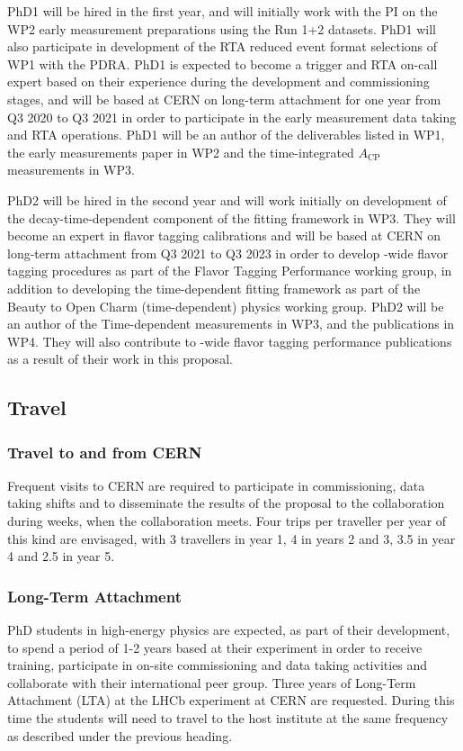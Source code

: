 \documentclass[11pt,a4paper]{article}
\begin{document}
PhD1 will be hired in the first year, and will initially work with the PI on the WP2 early measurement preparations using the Run 1+2 \LHCb datasets. PhD1 will also participate in development of the RTA reduced event format selections of WP1 with the PDRA. PhD1 is expected to become a trigger and RTA on-call expert based on their experience during the development and commissioning stages, and will be based at CERN on long-term attachment for one year from Q3 2020 to Q3 2021 in order to participate in the early measurement data taking and RTA operations. PhD1 will be an author of the deliverables listed in WP1, the early measurements paper in WP2 and the time-integrated $A_{\text{CP}}$ measurements in WP3.  

PhD2 will be hired in the second year and will work initially on development of the decay-time-dependent component of the fitting framework in WP3. They will become an expert in flavor tagging calibrations and will be based at CERN on long-term attachment from Q3 2021 to Q3 2023 in order to develop \LHCb-wide flavor tagging procedures as part of the Flavor Tagging Performance working group, in addition to developing the time-dependent fitting framework as part of the Beauty to Open Charm (time-dependent) physics working group. PhD2 will be an author of the Time-dependent measurements in WP3,  and the publications in WP4. They will also contribute to \LHCb-wide flavor tagging performance publications as a result of their work in this proposal.

\subsection{Travel} 

\subsubsection{Travel to and from CERN}
Frequent visits to CERN are required to participate in commissioning, data taking shifts and to disseminate the results of the proposal to the collaboration during \LHCb weeks, when the collaboration meets. Four trips per traveller per year of this kind are envisaged, with 3 travellers in year 1, 4 in years 2
and 3, 3.5 in year 4 and 2.5 in year 5. 


\subsubsection{Long-Term Attachment}
PhD students in high-energy physics are expected, as part of their development, to spend a period of 1-2 years based at their experiment in order to receive training, participate in on-site commissioning and data taking activities and collaborate with their international peer group. Three years of Long-Term Attachment (LTA) at the LHCb experiment at CERN are requested. During this time the students will need to travel to the host institute at the same frequency as described under the previous heading. 
\end{document}
